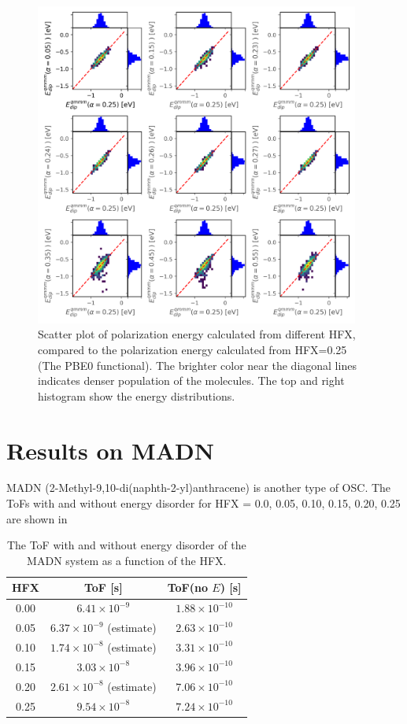 \documentclass[letterpaper,12pt]{article}
\begin{document}
\begin{figure}[h]
    \centering
    \includegraphics[width=0.95\textwidth]{figs/BCP_HFX/scatterEdip_qmmm.png}
    \caption{Scatter plot of polarization energy calculated from different HFX, compared to the polarization energy calculated from HFX=0.25 (The PBE0 functional). The brighter color near the diagonal lines indicates denser population of the molecules.  The top and right histogram show the energy distributions.}
    \label{fig:Edip_qmmm_BCP}
\end{figure}

\section{Results on MADN}
MADN (2-Methyl-9,10-di(naphth-2-yl)anthracene) is another type of OSC. 
The ToFs with and without energy disorder for HFX = 0.0, 0.05, 0.10, 0.15, 0.20, 0.25 are shown in 
\begin{table}[h]
    \centering
    \begin{tabular}{c c c }
    \hline
        HFX & ToF [s] & ToF(no $E$) [s] \\
    \hline
        0.00 &  $6.41 \times 10^{-9}$ & $1.88 \times 10^{-10}$ \\
        0.05 & $ 6.37 \times 10^{-9}$ (estimate) & $2.63 \times 10^{-10}$ \\
        0.10 & $ 1.74 \times 10^{-8}$ (estimate) & $3.31 \times 10^{-10} $ \\
        0.15 & $ 3.03 \times 10^{-8}$ & $3.96 \times 10^{-10} $ \\
        0.20 & $ 2.61 \times 10^{-8}$ (estimate) & $7.06 \times 10^{-10}$ \\
        0.25 & $ 9.54 \times 10^{-8}$ & $7.24 \times 10^{-10}$ \\
    \hline
    \end{tabular}
    \caption{The ToF with and without energy disorder of the MADN system as a function of the HFX. }
    \label{tab:ToF_MADN_HFX}
\end{table}
\end{document}

